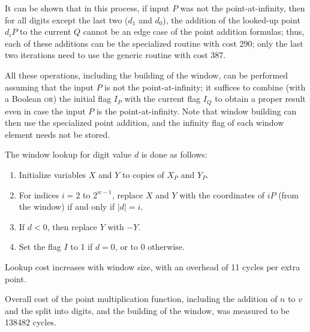 \documentclass{llncs}
\begin{document}
It can be shown that in this process, if input $P$ was not the
point-at-infinity, then for all digits except the last two ($d_1$ and
$d_0$), the addition of the looked-up point $d_i P$ to the current $Q$
cannot be an edge case of the point addition formulas; thus, each of
these additions can be the specialized routine with cost 290; only the
last two iterations need to use the generic routine with cost 387.

All these operations, including the building of the window, can be
performed assuming that the input $P$ is not the point-at-infinity; it
suffices to combine (with a Boolean \textsc{or}) the initial flag $I_P$
with the current flag $I_Q$ to obtain a proper result even in case the
input $P$ is the point-at-infinity. Note that window building can then
use the specialized point addition, and the infinity flag of each window
element needs not be stored.

The window lookup for digit value $d$ is done as follows:
\begin{enumerate}

    \item Initialize variables $X$ and $Y$ to copies of $X_P$ and $Y_P$.

    \item For indices $i = 2$ to $2^{w-1}$, replace $X$ and $Y$ with
    the coordinates of $iP$ (from the window) if and only if $|d| = i$.

    \item If $d < 0$, then replace $Y$ with $-Y$.

    \item Set the flag $I$ to 1 if $d = 0$, or to 0 otherwise.

\end{enumerate}
Lookup cost increases with window size, with an overhead of 11 cycles
per extra point.

Overall cost of the point multiplication function, including the
addition of $n$ to $v$ and the split into digits, and the building
of the window, was measured to be 138482 cycles.
\end{document}
